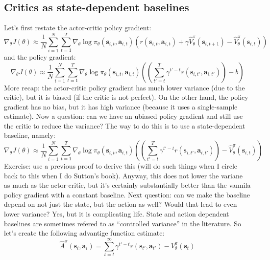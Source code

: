 \documentclass{report}
\begin{document}
\subsection{Critics as state-dependent baselines}
Let's first restate the actor-critic policy gradient:
\begin{equation}
	\nabla_\theta J(\theta) \approx \frac{1}{N} \sum_{i=1}^{N} \sum_{t=1}^{T} \nabla_{\theta} \log \pi_\theta(\bm{s}_{i,t}, \bm{a}_{i,t})
		\left( r(\bm{s}_{i,t}, \bm{a}_{i,t}) + \gamma \hat{V}^\pi_\theta(\bm{s}_{i,t+1}) - \hat{V}^\pi_\theta(\bm{s}_{i,t}) \right) 
\end{equation}
and the policy gradient:
\begin{equation}
		\nabla_\theta J(\theta) \approx \frac{1}{N} \sum_{i=1}^{N} \sum_{t=1}^{T} \nabla_{\theta} \log \pi_\theta(\bm{s}_{i,t}, \bm{a}_{i,t})
		\left( \left( \sum_{t'=t}^{T} \gamma^{t' -t} r(\bm{s}_{i,t'}, \bm{a}_{i,t'}) \right) -b \right) 
\end{equation}
More recap: the actor-critic policy gradient has much lower variance (due to the critic), but it is biased (if the critic is not perfect).
On the other hand, the policy gradient has no bias, but it has high variance (because it uses a single-sample estimate).
Now a question: can we have an ubiased policy gradient and still use the critic to reduce the variance?
The way to do this is to use a state-dependent baseline, namely:
\begin{equation}
		\nabla_\theta J(\theta) \approx \frac{1}{N} \sum_{i=1}^{N} \sum_{t=1}^{T} \nabla_{\theta} \log \pi_\theta(\bm{s}_{i,t}, \bm{a}_{i,t})
		\left( \left( \sum_{t'=t}^{T} \gamma^{t' -t} r(\bm{s}_{i,t'}, \bm{a}_{i,t'}) \right)  - \hat{V}^\pi_\theta(\bm{s}_{i,t}) \right) 
\end{equation}
Exercise: use a previous proof to derive this (will do such things when I circle back to this when I do Sutton's book).
Anyway, this does not lower the variane as much as the actor-critic, but it's certainly substantially better than the vannila policy gradient with a constant baseline.
Next question: can we make the baseline depend on not just the state, but the action as well? Would that lead to even lower variance?
Yes, but it is complicating life.
State and action dependent baselines are sometimes refered to as ``controlled variance'' in the literature.
So let's create the following advantige function estimate:
\begin{equation}
		\hat{A}^\pi (\bm{s}_{i}, \bm{a}_{i}) = \sum_{t=t}^{\infty} \gamma^{t'-t} r(\bm{s}_{t'}, \bm{a}_{t'}) - V^\pi_\theta(\bm{s}_t)
\end{equation}
\end{document}
